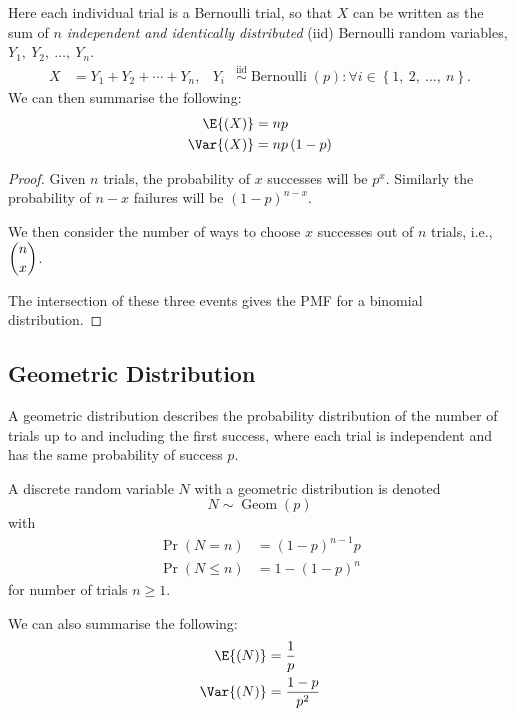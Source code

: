 \documentclass{article}
\begin{document}
\begin{multicols}{3}
    Here each individual trial is a Bernoulli trial, so that \(X\) can be written as the sum of
    \(n\) \textit{independent and identically distributed} (iid) Bernoulli random variables, \(Y_1,\: Y_2,\: \dots,\: Y_n\).
    \begin{align*}
        X & = Y_1 + Y_2 + \cdots + Y_n, & Y_i & \overset{\mathrm{iid}}{\sim} \operatorname{Bernoulli}{\left( p \right)} : \forall i \in \left\{ 1,\: 2,\: \dots,\: n \right\}.
    \end{align*}
    We can then summarise the following:
    \begin{align*}
        \E{\left( X \right)}   & = np                      \\
        \Var{\left( X \right)} & = np \left( 1 - p \right)
    \end{align*}
    \begin{proof}
        Given \(n\) trials, the probability of \(x\) successes will be \(p^x\).
        Similarly the probability of \(n - x\) failures will be \(\left( 1 - p \right)^{n - x}\).

        We then consider the number of ways to choose \(x\) successes out of \(n\) trials, i.e., \(\dbinom{n}{x}\).

        The intersection of these three events gives the PMF for a binomial distribution.
    \end{proof}
    \subsection{Geometric Distribution}
    A geometric distribution describes the probability distribution of the number of trials up to and including
    the first success, where each trial is independent and has the same probability of success \(p\).

    A discrete random variable \(N\) with a geometric distribution is denoted
    \begin{equation*}
        N \sim \operatorname{Geom}{\left( p \right)}
    \end{equation*}
    with
    \begin{align*}
        \Pr{\left( N = n \right)}    & = \left( 1 - p \right)^{n - 1} p \\
        \Pr{\left( N \leq n \right)} & = 1 - \left( 1 - p \right)^n
    \end{align*}
    for number of trials \(n \geq 1\).

    We can also summarise the following:
    \begin{align*}
        \E{\left( N \right)}   & = \frac{1}{p}       \\
        \Var{\left( N \right)} & = \frac{1 - p}{p^2}
    \end{align*}

\end{multicols}
\end{document}
